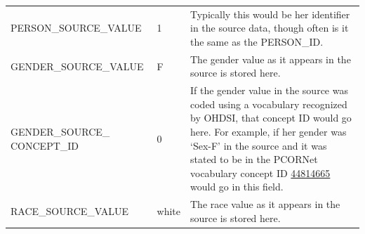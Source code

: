 \documentclass[]{book}
\begin{document}
\begin{longtable}[]{@{}lll@{}}
\begin{minipage}[t]{0.33\columnwidth}\raggedright\strut
PERSON\_SOURCE\_VALUE\strut
\end{minipage} & \begin{minipage}[t]{0.16\columnwidth}\raggedright\strut
1\strut
\end{minipage} & \begin{minipage}[t]{0.42\columnwidth}\raggedright\strut
Typically this would be her identifier in the source data, though often
is it the same as the PERSON\_ID.\strut
\end{minipage}\tabularnewline
\begin{minipage}[t]{0.33\columnwidth}\raggedright\strut
GENDER\_SOURCE\_VALUE\strut
\end{minipage} & \begin{minipage}[t]{0.16\columnwidth}\raggedright\strut
F\strut
\end{minipage} & \begin{minipage}[t]{0.42\columnwidth}\raggedright\strut
The gender value as it appears in the source is stored here.\strut
\end{minipage}\tabularnewline
\begin{minipage}[t]{0.33\columnwidth}\raggedright\strut
GENDER\_SOURCE\_ CONCEPT\_ID\strut
\end{minipage} & \begin{minipage}[t]{0.16\columnwidth}\raggedright\strut
0\strut
\end{minipage} & \begin{minipage}[t]{0.42\columnwidth}\raggedright\strut
If the gender value in the source was coded using a vocabulary
recognized by OHDSI, that concept ID would go here. For example, if her
gender was `Sex-F' in the source and it was stated to be in the PCORNet
vocabulary concept ID
\href{http://athena.ohdsi.org/search-terms/terms/44814665}{44814665}
would go in this field.\strut
\end{minipage}\tabularnewline
\begin{minipage}[t]{0.33\columnwidth}\raggedright\strut
RACE\_SOURCE\_VALUE\strut
\end{minipage} & \begin{minipage}[t]{0.16\columnwidth}\raggedright\strut
white\strut
\end{minipage} & \begin{minipage}[t]{0.42\columnwidth}\raggedright\strut
The race value as it appears in the source is stored here.\strut
\end{minipage}\tabularnewline

\end{longtable}
\end{document}

